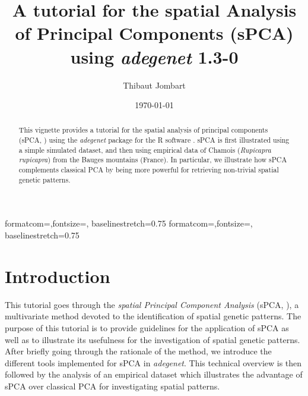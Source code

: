 \documentclass{article}
\title{A tutorial for the spatial Analysis of Principal Components (sPCA) using \textit{adegenet} 1.3-0}
\author{Thibaut Jombart}
\date{\today}
\begin{document}
{formatcom={\color{Sinput}},fontsize=\footnotesize, baselinestretch=0.75}
{formatcom={\color{Soutput}},fontsize=\footnotesize, baselinestretch=0.75}

\color{black}

\maketitle

\begin{abstract}
  This vignette provides a tutorial for the spatial analysis of principal components (sPCA, \cite{tjart04}) using
  the \textit{adegenet} package \cite{tjart05} for the R software \cite{np145}. sPCA is first
  illustrated using a simple simulated dataset, and then using empirical data of Chamois
  (\textit{Rupicapra rupicapra}) from the Bauges mountains (France). In particular, we illustrate
  how sPCA complements classical PCA by being more powerful for retrieving non-trivial spatial genetic patterns.
\end{abstract}


\newpage
\tableofcontents




\newpage
\section{Introduction}

This tutorial goes through the \emph{spatial Principal Component
  Analysis} (sPCA, \cite{tjart04}), a multivariate method devoted to
the identification of spatial genetic patterns.
The purpose of this tutorial is to provide guidelines for the application of sPCA as well as to
illustrate its usefulness for the investigation of spatial genetic patterns.
After briefly going through the rationale of the method, we introduce the different tools
implemented for sPCA in \textit{adegenet}.
This technical overview is then followed by the analysis of an empirical dataset which illustrates
the advantage of sPCA over classical PCA for investigating spatial patterns.




\end{document}
